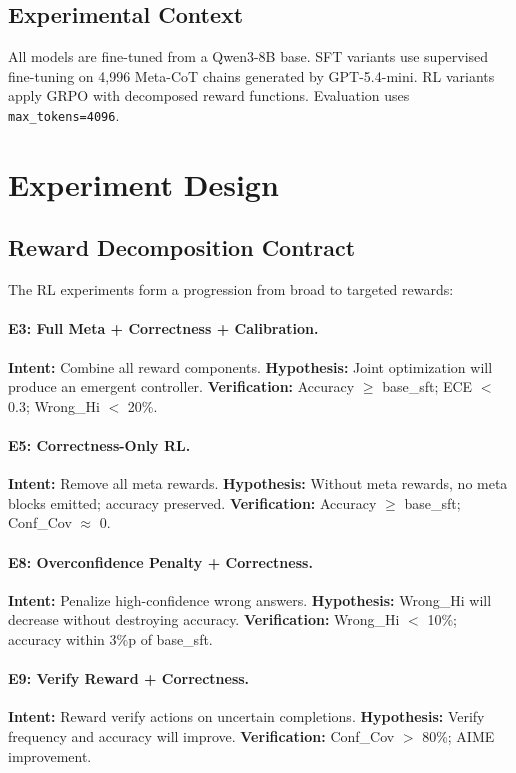 \documentclass[11pt,a4paper]{article}
\newcommand{\tok}[1]{\texttt{#1}}
\begin{document}
\subsection{Experimental Context}

All models are fine-tuned from a Qwen3-8B base. SFT variants use supervised fine-tuning on 4,996 Meta-CoT chains generated by GPT-5.4-mini. RL variants apply GRPO with decomposed reward functions. Evaluation uses \tok{max\_tokens=4096}.

\section{Experiment Design}

\subsection{Reward Decomposition Contract}

The RL experiments form a progression from broad to targeted rewards:

\paragraph{E3: Full Meta + Correctness + Calibration.}
\textbf{Intent:} Combine all reward components.
\textbf{Hypothesis:} Joint optimization will produce an emergent controller.
\textbf{Verification:} Accuracy $\geq$ base\_sft; ECE $<$ 0.3; Wrong\_Hi $<$ 20\%.

\paragraph{E5: Correctness-Only RL.}
\textbf{Intent:} Remove all meta rewards.
\textbf{Hypothesis:} Without meta rewards, no meta blocks emitted; accuracy preserved.
\textbf{Verification:} Accuracy $\geq$ base\_sft; Conf\_Cov $\approx$ 0.

\paragraph{E8: Overconfidence Penalty + Correctness.}
\textbf{Intent:} Penalize high-confidence wrong answers.
\textbf{Hypothesis:} Wrong\_Hi will decrease without destroying accuracy.
\textbf{Verification:} Wrong\_Hi $<$ 10\%; accuracy within 3\%p of base\_sft.

\paragraph{E9: Verify Reward + Correctness.}
\textbf{Intent:} Reward verify actions on uncertain completions.
\textbf{Hypothesis:} Verify frequency and accuracy will improve.
\textbf{Verification:} Conf\_Cov $>$ 80\%; AIME improvement.
\end{document}
